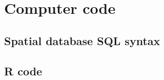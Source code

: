 \chapter{Computer code}\label{apx:A}
\newpage

\section{Spatial database SQL syntax}

\section{R code}